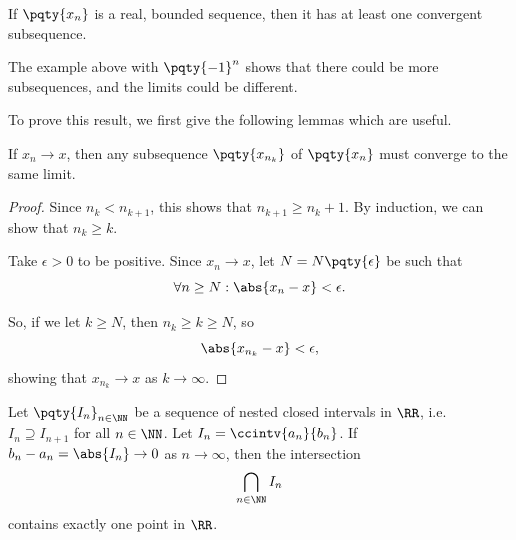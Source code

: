 \begin{theorem}
    \label{thm:bolzano-weierstrass}%
    If \(\pqty{x_n}\) is a real, bounded sequence, then it has at least one convergent subsequence.
\end{theorem}

The example above with \(\pqty{-1}^n\) shows that there could be more subsequences, and the limits could be different.

To prove this result, we first give the following lemmas which are useful.

\begin{lemma}
    \label{lem:seq-subsequence-same-limit}%
    If \(x_n \to x\), then any subsequence \(\pqty{x_{n_k}}\) of \(\pqty{x_n}\) must converge to the same limit.
\end{lemma}

\begin{proof}
    Since \(n_k < n_{k + 1}\), this shows that \(n_{k + 1} \geq n_k + 1\). By induction, we can show that \(n_k \geq k\).

    Take \(\epsilon > 0\) to be positive. Since \(x_n \to x\), let \(N = N\pqty{\epsilon}\) be such that
    \[
        \forall n \geq N: \abs{x_n - x} < \epsilon.
    \]

    So, if we let \(k \geq N\), then \(n_k \geq k \geq N\), so
    \[
        \abs{x_{n_k} - x} < \epsilon,
    \]
    showing that \(x_{n_k} \to x\) as \(k \to \infty\).
\end{proof}

\begin{theorem}
    \label{thm:nested-interval-thm}%
    Let \(\pqty{I_n}_{n \in \NN}\) be a sequence of nested closed intervals in \(\RR\), i.e. \(I_n \supseteq I_{n + 1}\) for all \(n \in \NN\). Let \(I_n = \ccintv{a_n}{b_n}\). If \(b_n - a_n = \abs{I_n} \to 0\) as \(n \to \infty\), then the intersection
    \[
        \bigcap_{n \in \NN} I_n
    \]
    contains exactly one point in \(\RR\).
\end{theorem}

